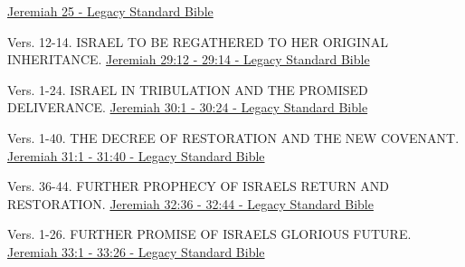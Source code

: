 \documentclass[
  ignorenonframetext,
]{beamer}
\begin{document}
\begin{frame}{25}
\label{section-80}
\href{https://read.lsbible.org/?q=jer25}{Jeremiah 25 - Legacy Standard
Bible}
\end{frame}

\begin{frame}{29}
\label{section-81}
\begin{block}{Vers. 12-14. ISRAEL TO BE REGATHERED TO HER ORIGINAL
INHERITANCE.}
\label{vers.-12-14.-israel-to-be-regathered-to-her-original-inheritance.}
\href{https://read.lsbible.org/?q=jer29\%3A12-14}{Jeremiah 29:12 - 29:14
- Legacy Standard Bible}
\end{block}
\end{frame}

\begin{frame}{30}
\label{section-82}
\begin{block}{Vers. 1-24. ISRAEL IN TRIBULATION AND THE PROMISED
DELIVERANCE.}
\label{vers.-1-24.-israel-in-tribulation-and-the-promised-deliverance.}
\href{https://read.lsbible.org/?q=jer30\%3A1-24}{Jeremiah 30:1 - 30:24 -
Legacy Standard Bible}
\end{block}
\end{frame}

\begin{frame}{31}
\label{section-83}
\begin{block}{Vers. 1-40. THE DECREE OF RESTORATION AND THE NEW
COVENANT.}
\label{vers.-1-40.-the-decree-of-restoration-and-the-new-covenant.}
\href{https://read.lsbible.org/?q=jer31\%3A1-40}{Jeremiah 31:1 - 31:40 -
Legacy Standard Bible}
\end{block}
\end{frame}

\begin{frame}{32}
\label{section-84}
\begin{block}{Vers. 36-44. FURTHER PROPHECY OF ISRAEL\textquotesingle S
RETURN AND RESTORATION.}
\label{vers.-36-44.-further-prophecy-of-israels-return-and-restoration.}
\href{https://read.lsbible.org/?q=jer32\%3A36-44}{Jeremiah 32:36 - 32:44
- Legacy Standard Bible}
\end{block}
\end{frame}

\begin{frame}{33}
\label{section-85}
\begin{block}{Vers. 1-26. FURTHER PROMISE OF ISRAEL\textquotesingle S
GLORIOUS FUTURE.}
\label{vers.-1-26.-further-promise-of-israels-glorious-future.}
\href{https://read.lsbible.org/?q=jer33\%3A1-26}{Jeremiah 33:1 - 33:26 -
Legacy Standard Bible}
\end{block}
\end{frame}
\end{document}
